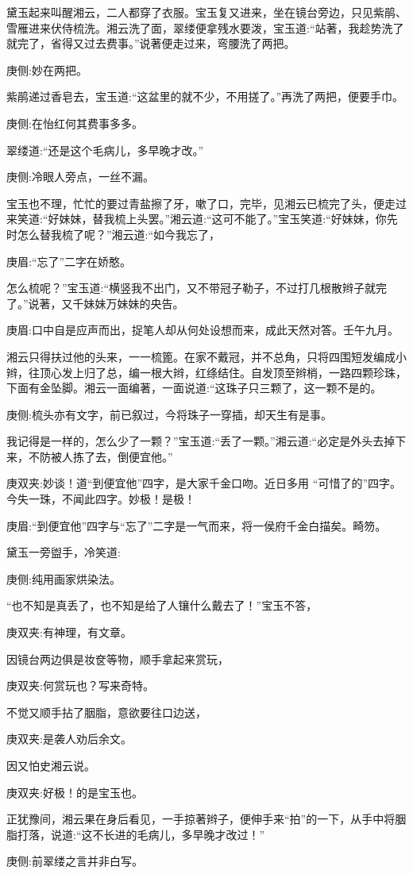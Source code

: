 \begin{parag}
    黛玉起来叫醒湘云，二人都穿了衣服。宝玉复又进来，坐在镜台旁边，只见紫鹃、雪雁进来伏侍梳洗。湘云洗了面，翠缕便拿残水要泼，宝玉道:“站著，我趁势洗了就完了，省得又过去费事。”说著便走过来，弯腰洗了两把。\begin{note}庚侧:妙在两把。\end{note}紫鹃递过香皂去，宝玉道:“这盆里的就不少，不用搓了。”再洗了两把，便要手巾。\begin{note}庚侧:在怡红何其费事多多。\end{note}翠缕道:“还是这个毛病儿，多早晚才改。”\begin{note}庚侧:冷眼人旁点，一丝不漏。\end{note}宝玉也不理，忙忙的要过青盐擦了牙，嗽了口，完毕，见湘云已梳完了头，便走过来笑道:“好妹妹，替我梳上头罢。”湘云道:“这可不能了。”宝玉笑道:“好妹妹，你先时怎么替我梳了呢？”湘云道:“如今我忘了，\begin{note}庚眉:“忘了”二字在娇憨。\end{note}怎么梳呢？”宝玉道:“横竖我不出门，又不带冠子勒子，不过打几根散辫子就完了。”说著，又千妹妹万妹妹的央告。\begin{note}庚眉:口中自是应声而出，捉笔人却从何处设想而来，成此天然对答。壬午九月。\end{note}湘云只得扶过他的头来，一一梳篦。在家不戴冠，并不总角，只将四围短发编成小辫，往顶心发上归了总，编一根大辫，红绦结住。自发顶至辫梢，一路四颗珍珠，下面有金坠脚。湘云一面编著，一面说道:“这珠子只三颗了，这一颗不是的。\begin{note}庚侧:梳头亦有文字，前已叙过，今将珠子一穿插，却天生有是事。\end{note}我记得是一样的，怎么少了一颗？”宝玉道:“丢了一颗。”湘云道:“必定是外头去掉下来，不防被人拣了去，倒便宜他。”\begin{note}庚双夹:妙谈！道“到便宜他”四字，是大家千金口吻。近日多用 “可惜了的”四字。今失一珠，不闻此四字。妙极！是极！\end{note}\begin{note}庚眉:“到便宜他”四字与“忘了”二字是一气而来，将一侯府千金白描矣。畸笏。\end{note}黛玉一旁盥手，冷笑道:\begin{note}庚侧:纯用画家烘染法。\end{note}“也不知是真丢了，也不知是给了人镶什么戴去了！”宝玉不答，\begin{note}庚双夹:有神理，有文章。\end{note}因镜台两边俱是妆奁等物，顺手拿起来赏玩，\begin{note}庚双夹:何赏玩也？写来奇特。\end{note}不觉又顺手拈了胭脂，意欲要往口边送，\begin{note}庚双夹:是袭人劝后余文。\end{note}因又怕史湘云说。\begin{note}庚双夹:好极！的是宝玉也。\end{note}正犹豫间，湘云果在身后看见，一手掠著辫子，便伸手来“拍”的一下，从手中将胭脂打落，说道:“这不长进的毛病儿，多早晚才改过！”\begin{note}庚侧:前翠缕之言并非白写。\end{note}
\end{parag}



